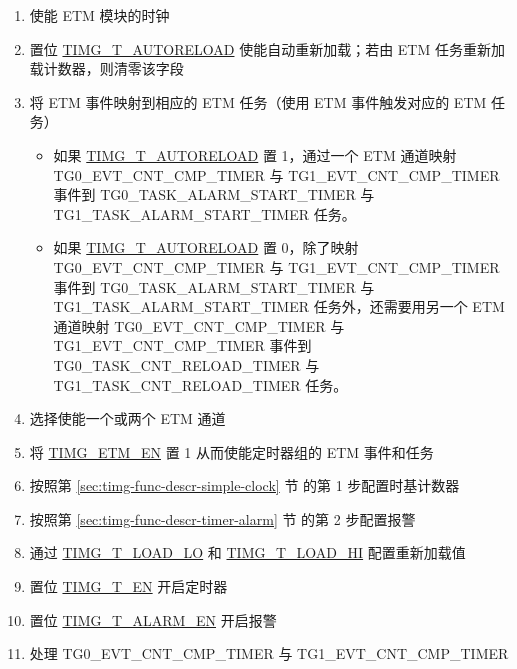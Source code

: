 \documentclass[main\_\_CN.tex]{subfiles}
\begin{document}
\begin{enumerate}
    \item 使能 ETM 模块的时钟
    \item 置位 \hyperref[fielddesc:TIMGTXAUTORELOAD]{TIMG\_T\_AUTORELOAD} 使能自动重新加载；若由 ETM 任务重新加载计数器，则清零该字段
    \item 将 ETM 事件映射到相应的 ETM 任务（使用 ETM 事件触发对应的 ETM 任务）
    \begin{itemize}
        \item 如果 \hyperref[fielddesc:TIMGTXAUTORELOAD]{TIMG\_T\_AUTORELOAD} 置 1，通过一个 ETM 通道映射 TG0\_EVT\_CNT\_CMP\_TIMER 与 TG1\_EVT\_CNT\_CMP\_TIMER 事件到 TG0\_TASK\_ALARM\_START\_TIMER 与 TG1\_TASK\_ALARM\_START\_TIMER 任务。
        \item 如果 \hyperref[fielddesc:TIMGTXAUTORELOAD]{TIMG\_T\_AUTORELOAD} 置 0，除了映射 TG0\_EVT\_CNT\_CMP\_TIMER 与 TG1\_EVT\_CNT\_CMP\_TIMER 事件到 TG0\_TASK\_ALARM\_START\_TIMER 与 TG1\_TASK\_ALARM\_START\_TIMER 任务外，还需要用另一个 ETM 通道映射 TG0\_EVT\_CNT\_CMP\_TIMER 与 TG1\_EVT\_CNT\_CMP\_TIMER 事件到 TG0\_TASK\_CNT\_RELOAD\_TIMER 与 TG1\_TASK\_CNT\_RELOAD\_TIMER 任务。
    \end{itemize}
    \item 选择使能一个或两个 ETM 通道
    \item 将 \hyperref[fielddesc:TIMGETMEN]{TIMG\_ETM\_EN} 置 1 从而使能定时器组的 ETM 事件和任务
    \item 按照第 \ref{sec:timg-func-descr-simple-clock} 节 \textit{} 的第 1 步配置时基计数器
    \item 按照第 \ref{sec:timg-func-descr-timer-alarm} 节 \textit{} 的第 2 步配置报警
    \item 通过 \hyperref[fielddesc:TIMGTXLOADLO]{TIMG\_T\_LOAD\_LO} 和 \hyperref[fielddesc:TIMGTXLOADHI]{TIMG\_T\_LOAD\_HI} 配置重新加载值
    \item 置位 \hyperref[fielddesc:TIMGTXEN]{TIMG\_T\_EN} 开启定时器
    \item 置位 \hyperref[fielddesc:TIMGTXALARMEN]{TIMG\_T\_ALARM\_EN} 开启报警
    \item 处理 TG0\_EVT\_CNT\_CMP\_TIMER 与 TG1\_EVT\_CNT\_CMP\_TIMER
    \begin{itemize}

\end{itemize}
\end{enumerate}
\end{document}
